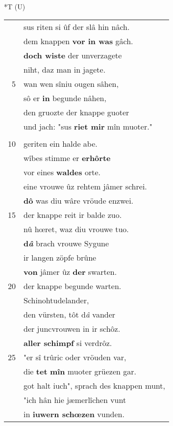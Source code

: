 \documentclass[8pt,a4paper,notitlepage]{article}
\begin{document}
\begin{table}[ht]
\begin{minipage}[t]{0.5\linewidth}
\small
\begin{center}*T (U)
\end{center}
\begin{tabular}{rl}
 & sus riten si ûf der slâ hin nâch.\\ 
 & dem knappen \textbf{vor in was} gâch.\\ 
 & \textbf{doch wiste} der unverzagete\\ 
 & niht, daz man in jagete.\\ 
5 & wan wen sîniu ougen sâhen,\\ 
 & sô er \textbf{in} begunde nâhen,\\ 
 & den gruozte der knappe guoter\\ 
 & und jach: "sus \textbf{riet mir} mîn muoter."\\ 
 & \textbf{\begin{large}A\end{large}lsus} kam unser \textbf{küener} knabe\\ 
10 & geriten ein halde abe.\\ 
 & wîbes stimme er \textbf{erhôrte}\\ 
 & vor eines \textbf{waldes} orte.\\ 
 & eine vrouwe ûz rehtem jâmer schrei.\\ 
 & \textbf{dô} was diu wâre vröude enzwei.\\ 
15 & der knappe reit ir balde zuo.\\ 
 & nû hœret, waz diu vrouwe tuo.\\ 
 & \textbf{d\textit{â}} brach vrouwe Sygune\\ 
 & ir langen zöpfe brûne\\ 
 & \textbf{von} jâmer ûz \textbf{der} swarten.\\ 
20 & der knappe begunde warten.\\ 
 & Schinohtudelander,\\ 
 & den vürsten, tôt d\textit{â} vander\\ 
 & der juncvrouwen in ir schôz.\\ 
 & \textbf{aller schimpf} si verdrôz.\\ 
25 & "er sî trûric oder vröuden var,\\ 
 & die \textbf{tet} \textbf{mîn} muoter grüezen gar.\\ 
 & got halt iuch", sprach des knappen munt,\\ 
 & "ich hân hie jæmerlîchen vunt\\ 
 & in \textbf{iuwern schœzen} vunden.\\ 

\end{tabular}
\end{minipage}
\end{table}
\end{document}
